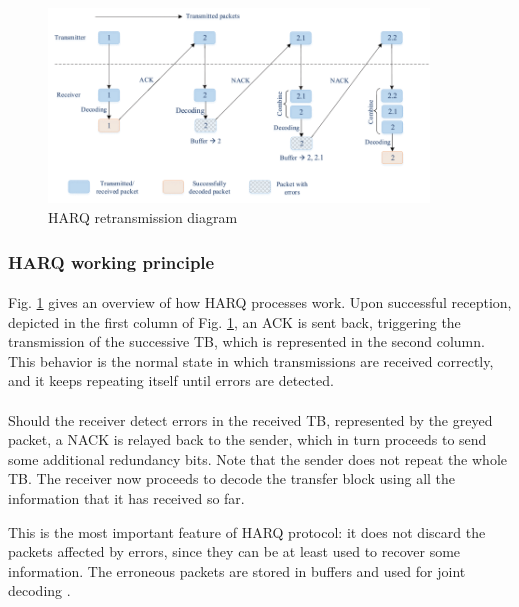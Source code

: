 \begin{figure}[ht]
    \centering
    \includegraphics[width=0.9\textwidth]{res/harq-retx-scheme.png}
    \caption{\ac{HARQ} retransmission diagram \cite{harq-wireless-communications-survey}}
    \label{fig:harq_retx_scheme}
\end{figure}

\subsubsection{HARQ working principle}
\paragraph{}
Fig. \ref{fig:harq_retx_scheme} gives an overview of how \ac{HARQ} processes work. Upon successful reception, depicted in the first column of Fig. \ref{fig:harq_retx_scheme}, an \ac{ACK} is sent back, triggering the transmission of the successive \ac{TB}, which is represented in the second column. This behavior is the normal state in which transmissions are received correctly, and it keeps repeating itself until errors are detected.

\paragraph{} Should the receiver detect errors in the received \ac{TB}, represented by the greyed packet, a \ac{NACK} is relayed back to the sender, which in turn proceeds to send some additional redundancy bits. Note that the sender does not repeat the whole \ac{TB}. The receiver now proceeds to decode the transfer block using all the information that it has received so far.

This is the most important feature of \ac{HARQ} protocol: it does not discard the packets affected by errors, since they can be at least used to recover some information. The erroneous packets are stored in buffers and used for joint decoding \cite{5g-nr-harq-devopedia}. 

